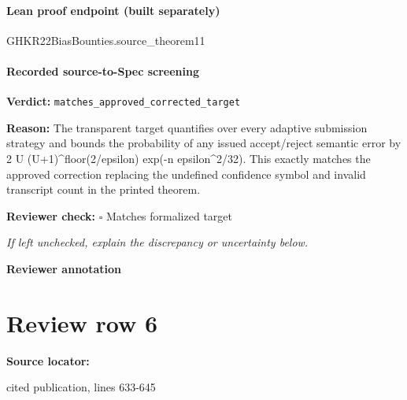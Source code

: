 \documentclass[10pt]{article}
\newcommand{\reviewerbox}{%
  \par\noindent\fbox{\parbox{0.96\linewidth}{\rule{0pt}{0.38in}}}\par
}
\newcommand{\reviewmatch}[1]{%
  \par\noindent\textbf{Reviewer check:} $\square$\; #1\par
  \noindent\emph{If left unchecked, explain the discrepancy or uncertainty below.}\par
}
\begin{document}
\paragraph{Lean proof endpoint (built separately)}\begin{ReviewVerbatim}
GHKR22BiasBounties.source_theorem11
\end{ReviewVerbatim}

\paragraph{Recorded source-to-Spec screening}
\textbf{Verdict:} \texttt{matches\_approved\_corrected\_target}
\\
{\raggedright
\textbf{Reason:} The transparent target quantifies over every adaptive submission strategy and bounds the probability of any issued accept/\allowbreak{}reject semantic error by 2 U (U+1)\textasciicircum{}floor(2/\allowbreak{}epsilon) exp(-\allowbreak{}n epsilon\textasciicircum{}2/\allowbreak{}32).\allowbreak{} This exactly matches the approved correction replacing the undefined confidence symbol and invalid transcript count in the printed theorem.\allowbreak{}
\par}
\reviewmatch{Matches formalized target}
\noindent\textbf{Reviewer annotation}\par
\reviewerbox
\clearpage
\hypertarget{source-claim-003d53e732ab3276}{}
\section*{Review row 6}
\textbf{Source locator:} {\footnotesize\raggedright cited publication, lines 633-\allowbreak{}645\par}
\end{document}
